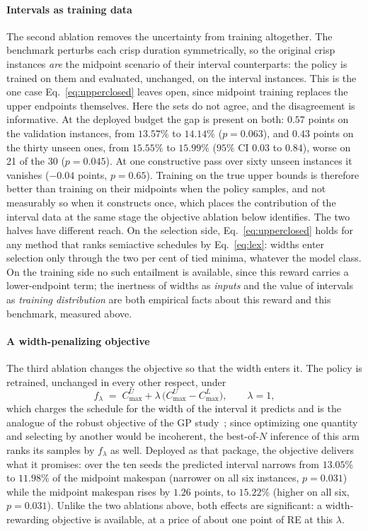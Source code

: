 \documentclass[preprint,12pt]{elsarticle}
\theoremstyle{definition}
\theoremstyle{remark}
\begin{document}
\paragraph{Intervals as training data} The second ablation removes
the uncertainty from training altogether. The benchmark perturbs each
crisp duration symmetrically, so the original crisp instances
\emph{are} the midpoint scenario of their interval counterparts: the
policy is trained on them and evaluated, unchanged, on the interval
instances. This is the one case Eq.~\eqref{eq:upperclosed} leaves
open, since midpoint training replaces the upper endpoints
themselves. Here the sets do not agree, and the disagreement is
informative. At the deployed budget
the gap is present on both: $0.57$ points on the validation
instances, from $13.57\%$ to $14.14\%$ ($p=0.063$), and $0.43$ points
on the thirty unseen ones, from $15.55\%$ to $15.99\%$ ($95\%$ CI
$0.03$ to $0.84$), worse on 21 of the 30 ($p=0.045$). At one
constructive pass over sixty unseen instances it vanishes
($-0.04$ points, $p=0.65$). Training on the true upper bounds is
therefore better than training on their midpoints when the policy
samples, and not measurably so when it constructs once, which places
the contribution of the interval data at the same stage the objective
ablation below identifies. The two halves have different reach. On
the selection side, Eq.~\eqref{eq:upperclosed} holds for any method
that ranks semiactive schedules by Eq.~\eqref{eq:lex}: widths enter
selection only through the two per cent of tied minima, whatever the
model class. On the training side no such entailment is available,
since this reward carries a lower-endpoint term; the inertness of
widths as \emph{inputs} and the value of intervals as
\emph{training distribution} are both empirical facts about this
reward and this benchmark, measured above.

\paragraph{A width-penalizing objective} The third ablation changes
the objective so that the width enters it. The policy is retrained,
unchanged in every other respect, under
\begin{equation}
\label{eq:robust}
f_\lambda \;=\; C^U_{\max} + \lambda\,\bigl(C^U_{\max}-C^L_{\max}\bigr),
\qquad \lambda=1,
\end{equation}
which charges the schedule for the width of the interval it predicts
and is the analogue of the robust objective of the GP study~\citep{DiazGP2026};
since optimizing one quantity and selecting by another would be
incoherent, the best-of-$N$ inference of this arm ranks its samples by
$f_\lambda$ as well. Deployed as that package, the objective delivers
what it promises: over the ten seeds the predicted interval narrows
from $13.05\%$ to $11.98\%$ of the midpoint makespan (narrower on all
six instances, $p=0.031$) while the midpoint makespan rises by
$1.26$ points, to $15.22\%$ (higher on all six, $p=0.031$). Unlike
the two ablations above, both effects are significant: a
width-rewarding objective is available, at a price of about one point
of RE at this $\lambda$.
\end{document}
